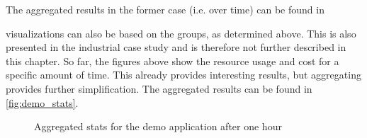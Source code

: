 \noindent
The aggregated results in the former case (i.e. over time) can be found in  

visualizations can also be based on the groups, as determined above. This is also presented in the industrial case study and is therefore not further described in this chapter. So far, the figures above show the resource usage and cost for a specific amount of time. This already provides interesting results, but aggregating provides further simplification. The aggregated results can be found in \autoref{fig:demo_stats}.

\begin{figure}
    \centering
    
    \caption{Aggregated stats for the demo application after one hour}
    \label{fig:demo_stats}
\end{figure}